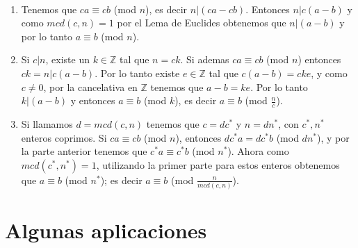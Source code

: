 \documentclass{report}
\begin{document}
\begin{myproof}\ \\
    \begin{enumerate}
        \item Tenemos que $ca\equiv cb$ (mod $n$), es decir $n|(ca-cb)$. Entonces $n|c(a-b)$ y como $mcd(c,n)=1$ por el Lema de Euclides obtenemos que $n|(a-b)$ y por lo tanto $a\equiv b$ (mod $n$).
        \item Si $c|n$, existe un $k\in\mathbb{Z}$ tal que $n=ck$. Si ademas $ca\equiv cb$ (mod $n$) entonces $ck=n|c(a-b)$. Por lo tanto existe $e\in\mathbb{Z}$ tal que $c(a-b)=cke$, y como $c\neq 0$, por la cancelativa en $\mathbb{Z}$ tenemos que $a-b=ke$. Por lo tanto $k|(a-b)$ y entonces $a\equiv b$ (mod $k$), es decir $a\equiv b$ (mod $\frac{n}{c}$).
        \item Si llamamos $d=mcd(c,n)$ tenemos que $c=dc^*$ y $n=dn^*$, con $c^*,n^*$ enteros coprimos. Si $ca\equiv cb$ (mod $n$), entonces $dc^*a=dc^*b$ (mod $dn^*$), y por la parte anterior tenemos que $c^*a\equiv c^*b$ (mod $n^*$). Ahora como $mcd(c^*,n^*)=1$, utilizando la primer parte para estos enteros obtenemos que $a\equiv b$ (mod $n^*$); es decir $a\equiv b$ (mod $\frac{n}{mcd(c,n)}$).
    \end{enumerate}
\end{myproof}
\newpage\section{Algunas aplicaciones}
\end{document}
